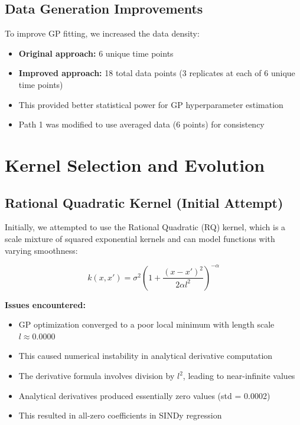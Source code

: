 \documentclass[11pt]{article}
\begin{document}
\subsection{Data Generation Improvements}

To improve GP fitting, we increased the data density:
\begin{itemize}
    \item \textbf{Original approach:} 6 unique time points
    \item \textbf{Improved approach:} 18 total data points (3 replicates at each of 6 unique time points)
    \item This provided better statistical power for GP hyperparameter estimation
    \item Path 1 was modified to use averaged data (6 points) for consistency
\end{itemize}

\section{Kernel Selection and Evolution}

\subsection{Rational Quadratic Kernel (Initial Attempt)}

Initially, we attempted to use the Rational Quadratic (RQ) kernel, which is a scale mixture of squared exponential kernels and can model functions with varying smoothness:

\begin{equation}
k(x, x') = \sigma^2 \left(1 + \frac{(x-x')^2}{2\alpha l^2}\right)^{-\alpha}
\end{equation}

\textbf{Issues encountered:}
\begin{itemize}
    \item GP optimization converged to a poor local minimum with length scale $l \approx 0.0000$
    \item This caused numerical instability in analytical derivative computation
    \item The derivative formula involves division by $l^2$, leading to near-infinite values
    \item Analytical derivatives produced essentially zero values (std = 0.0002)
    \item This resulted in all-zero coefficients in SINDy regression
\end{itemize}
\end{document}
